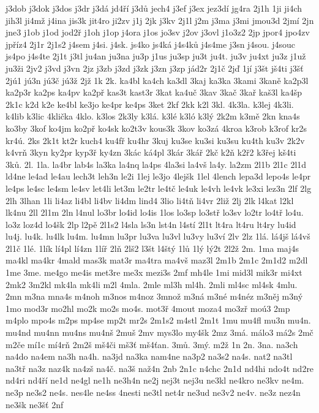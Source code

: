 {j3dob
j3dok
j3dos
j3dr
j3dá
jd4ří
j3dů
jech4
j3ef
j3ex
jez3dí
jg4ra
2j1h
1ji
ji4ch
jih3l
ji4mž
j4ina
jis3k
jit4ro
ji2zv
j1j
2jk
j3kv
2j1l
j2m
j3ma
j3mi
jmou3d
2jmí
2jn
jne3
j1ob
j1od
jod2ř
j1oh
j1op
j4ora
j1os
jo3sv
j2ov
j3ovl
j1o3z2
2jp
jpor4
jpo4zv
jpříz4
2j1r
2j1s2
j4sem
j4si.
j4sk.
js4ko
js4ká
j4s4ků
j4s4me
j3sn
j4sou.
j4souc
js4po
j4s4te
2j1t
j3tl
ju4an
ju3na
ju3p
j1us
ju3sp
ju3t
ju4t.
ju3v
ju4xt
ju3z
j1už
ju3ži
2jv2
j3vd
j3vn
2jz
j3zb
j3zd
j3zk
j3zn
j3zp
jád2r
2j1č
2jď
1jí
j3št
jš4ti
j3šť
2jú1
jú3n
jú3č
jú3ž
2jž
1k
2k.
ka4bl
ka4ch
ka3dl
3kaj
ka3ka
3kami
3kaně
ka2p3l
ka2p3r
ka2ps
ka4pv
ka2př
kas3t
kast3r
3kat
ka4uč
3kav
3kač
3kař
kaš3l
ka4šp
2k1c
k2d
k2e
ke4bl
ke3jo
ke4pr
ke4ps
3ket
2kf
2kk
k2l
3kl.
4k3la.
k3lej
4k3li.
k4lib
k3lic
4klička
4klo.
k3los
2k3ly
k3lá.
k3lé
k3ló
k3lý
2k2m
k3mě
2kn
kna4s
ko3by
3kof
ko4jm
ko2př
ko4sk
ko2t3v
kous3k
3kov
ko3zá
4kroa
k3rob
k3rof
kr2s
kr4ú.
2ks
2k1t
kt2r
kuch4
ku4fř
ku4hr
3kuj
ku3se
ku3si
ku3su
ku4th
ku3v
2k2v
k4vrň
3kyn
ky2pr
kyp3ř
ky4zn
3kác
ká4pl
3kár
3kář
2kč
k2ň
k2ř2
k3řej
kš4ti
3ků.
2l.
1la.
la4br
lab4s
la3ka
la4nq
la4ps
4la3si
la4vš
la4y.
la2zm
2l1b
2l1c
2l1d
ld4ne
le4ad
le4au
lech3t
leh3n
le2i
1lej
le3jo
4lejšk
1lel
4lench
lepa3d
lepo4s
le4pr
le4ps
le4sc
le4sm
le4sv
let4li
let3m
le2tr
le4tč
le4uk
le4vh
le4vk
le3xi
lez3n
2lf
2lg
2lh
3lhan
1li
li4az
li4bl
li4bv
li4dm
lind4
3lio
li4tň
li4vr
2liž
2lj
2lk
l4kat
l2kl
lk4nu
2ll
2l1m
2ln
l4nul
lo3br
lo4id
lo4is
1los
lo3sp
lo3stř
lo3sv
lo2tr
lo4tř
lo4u.
lo3z
loz4d
lo4šk
2lp
l2pě
2l1s2
l4sla
ls3n
lst4n
l4stí
2l1t
lt4ra
lt4ru
lt4ry
lu4id
lu4j.
lu4k.
lu4lk
lu4m.
lu4mn
lu3pr
lu3va
lu3vl
lu3vy
lu3ví
2lv
2lz
1lá.
lá4jš
lá4vš
2l1č
1lé.
1lík
lí4pl
lí4zn
1líř
2lň
2lš2
l3št
l4štý
1lů
1lý
lý2t
2l2ž
2m.
1ma
maj4s
ma4kl
ma4kr
4mald
mas3k
mat3r
ma4tra
ma4vš
maz3l
2m1b
2m1c
2m1d2
m2dl
1me
3me.
me4go
me4is
met3re
me3x
mezi3s
2mf
mh4le
1mi
mid3l
mik3r
mi4xt
2mk2
3m2kl
mk4la
mk4li
m2l
4mla.
2mle
ml3h
ml4h.
2mli
ml4sc
ml4sk
4mlu.
2mn
m3na
mna4s
m4noh
m3nos
m4noz
3množ
m3ná
m3né
m4néz
m3něj
m3ný
1mo
mod3r
mo2hl
mo2k
mo2s
mo4s.
mot3ř
4mout
moza4
mo3zř
moú3
2mp
m4plo
mpo4s
m2ps
mp4se
mp2t
mr2s
2m1s2
m4stl
2m1t
1mu
mu4fl
mu3n
mu4n.
mu4nd
mu4nn
mu4ns
mu4nš
2muš
2mv
mys3lo
my4šk
2mz
3má.
málo3
má2s
2mč
m2če
mí1c
mí4rň
2m2š
mš4či
mš3ť
mš4ťan.
3mů.
3mý.
m2ž
1n
2n.
3na.
na3ch
na4do
na4em
na3h
na4h.
na3jd
na3ka
nam4ne
na3p2
na3s2
na4s.
nat2
na3tl
na3tř
na3z
naz4k
na4zš
na4č.
na3š
naž4n
2nb
2n1c
n4chc
2n1d
nd4hi
ndo4t
nd2re
nd4ri
nd4ří
ne1d
ne4gl
ne1h
ne3h4n
ne2j
nej3t
nej3u
ne3kl
ne4kro
ne3kv
ne4m.
ne3p
ne3s2
ne4s.
nes4le
ne4ss
4nesti
ne3tl
net4r
ne3ud
ne3v2
ne4v.
ne3z
nez4n
ne3šk
ne3šť
2nf
}

